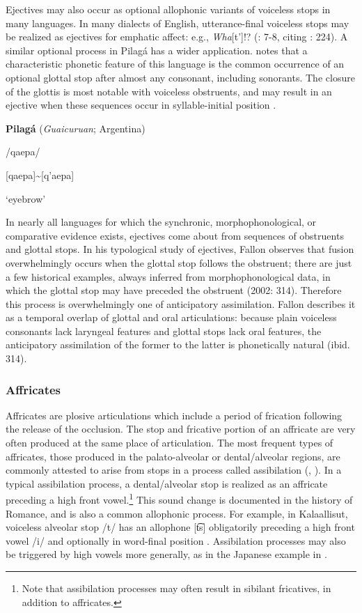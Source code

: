  Ejectives may also occur as optional allophonic variants of voiceless stops in many languages. In many dialects of English, utterance-final voiceless stops may be realized as ejectives for emphatic affect: e.g., \textit{Wha}[t’]!? (\citealt{Fallon2002}: 7-8, citing \citealt{Taylor1995}: 224). A similar optional process in Pilagá has a wider application. \citet{Vidal2001} notes that a characteristic phonetic feature of this language is the common occurrence of an optional glottal stop after almost any consonant, including sonorants. The closure of the glottis is most notable with voiceless obstruents, and may result in an ejective when these sequences occur in syllable-initial position .

\ea\label{ex:(4.44)}
  \textbf{Pilagá} (\textit{Guaicuruan}; Argentina)

/qaepa/

[qaepa]{\textasciitilde}[q’aepa]

\glt ‘eyebrow’

\citep[36]{Vidal2001}

\z

  In nearly all languages for which the synchronic, morphophonological, or comparative evidence exists, ejectives come about from sequences of obstruents and glottal stops. In his typological study of ejectives, Fallon observes that fusion overwhelmingly occurs when the glottal stop follows the obstruent; there are just a few historical examples, always inferred from morphophonological data, in which the glottal stop may have preceded the obstruent (2002: 314). Therefore this process is overwhelmingly one of anticipatory assimilation. Fallon describes it as a temporal overlap of glottal and oral articulations: because plain voiceless consonants lack laryngeal features and glottal stops lack oral features, the anticipatory assimilation of the former to the latter is phonetically natural (ibid. 314).

\subsubsection{{Affricates}}\label{sec:4.5.2.4}

  Affricates are plosive articulations which include a period of frication following the release of the occlusion. The stop and fricative portion of an affricate are very often produced at the same place of articulation. The most frequent types of affricates, those produced in the palato-alveolar or dental/alveolar regions, are commonly attested to arise from stops in a process called assibilation (\citealt{HallHamann2006}, \citealt{Telfer2006}). In a typical assibilation process, a dental/alveolar stop is realized as an affricate preceding a high front vowel.\footnote{ \textrm{Note that assibilation processes may often result in sibilant fricatives, in addition to affricates.}} This sound change is documented in the history of Romance, and is also a common allophonic process. For example, in Kalaallisut, voiceless alveolar stop /t/ has an allophone [t͡s] obligatorily preceding a high front vowel /i/ and optionally in word-final position \citep[333]{Fortescue1984}. Assibilation processes may also be triggered by high vowels more generally, as in the Japanese example in .

